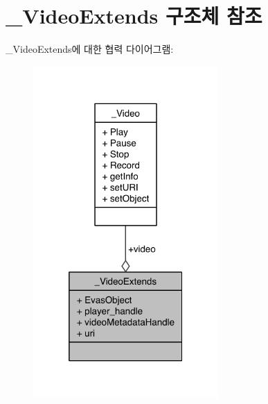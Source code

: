 \hypertarget{struct___video_extends}{\section{\-\_\-\-Video\-Extends 구조체 참조}
\label{struct___video_extends}
}


\-\_\-\-Video\-Extends에 대한 협력 다이어그램\-:\nopagebreak
\begin{figure}[H]
\begin{center}
\leavevmode
\includegraphics[width=200pt]{de/d5b/struct___video_extends__coll__graph}
\end{center}
\end{figure}
